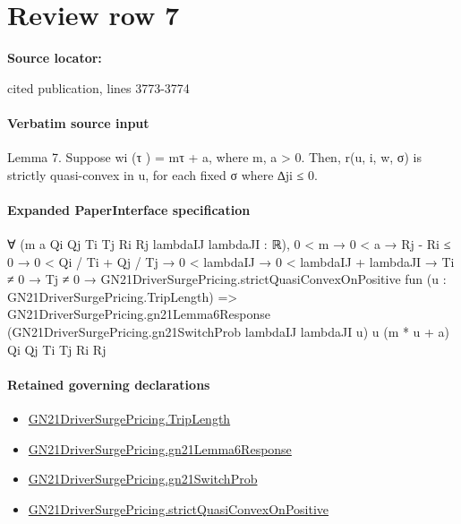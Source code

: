 \documentclass[10pt]{article}
\begin{document}
\section*{Review row 7}
\textbf{Source locator:} {\footnotesize\raggedright cited publication, lines 3773-\allowbreak{}3774\par}
\paragraph{Verbatim source input}
\begin{ReviewVerbatim}
Lemma 7. Suppose wi (τ ) = mτ + a, where m, a > 0. Then, r(u, i, w, σ) is strictly quasi-convex in
u, for each fixed σ where ∆ji ≤ 0.
\end{ReviewVerbatim}



\paragraph{Expanded PaperInterface specification}
\begin{ReviewVerbatim}
∀ (m a Qi Qj Ti Tj Ri Rj lambdaIJ lambdaJI : ℝ),
  0 < m →
    0 < a →
      Rj - Ri ≤ 0 →
        0 < Qi / Ti + Qj / Tj →
          0 < lambdaIJ →
            0 < lambdaIJ + lambdaJI →
              Ti ≠ 0 →
                Tj ≠ 0 →
                  GN21DriverSurgePricing.strictQuasiConvexOnPositive fun (u : GN21DriverSurgePricing.TripLength) =>
                    GN21DriverSurgePricing.gn21Lemma6Response
                      (GN21DriverSurgePricing.gn21SwitchProb lambdaIJ lambdaJI u) u (m * u + a) Qi Qj Ti Tj Ri Rj
\end{ReviewVerbatim}

\paragraph{Retained governing declarations}
\begin{itemize}\raggedright
\item \hyperlink{governing-declaration-a616c143f22cf2bc}{GN21\allowbreak{}Driver\allowbreak{}Surge\allowbreak{}Pricing.\allowbreak{}Trip\allowbreak{}Length}
\item \hyperlink{governing-declaration-068ec7eedec65036}{GN21\allowbreak{}Driver\allowbreak{}Surge\allowbreak{}Pricing.\allowbreak{}gn21\allowbreak{}Lemma6\allowbreak{}Response}
\item \hyperlink{governing-declaration-2506e20884d6eb69}{GN21\allowbreak{}Driver\allowbreak{}Surge\allowbreak{}Pricing.\allowbreak{}gn21\allowbreak{}Switch\allowbreak{}Prob}
\item \hyperlink{governing-declaration-36f2e53a953be3da}{GN21\allowbreak{}Driver\allowbreak{}Surge\allowbreak{}Pricing.\allowbreak{}strict\allowbreak{}Quasi\allowbreak{}Convex\allowbreak{}On\allowbreak{}Positive}
\end{itemize}
\end{document}
